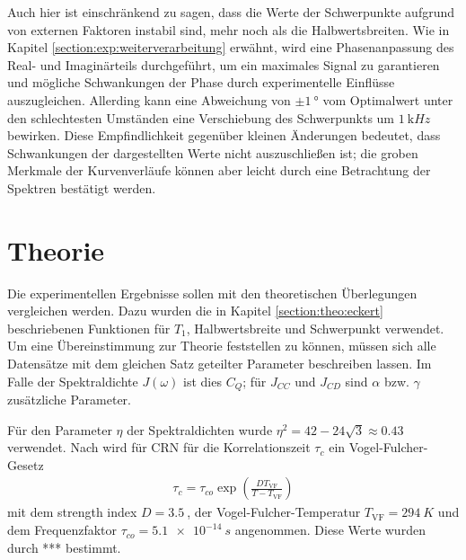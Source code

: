 Auch hier ist einschränkend zu sagen, dass die Werte der Schwerpunkte aufgrund von externen Faktoren instabil sind, mehr noch als die Halbwertsbreiten. Wie in Kapitel \ref{section:exp:weiterverarbeitung} erwähnt, wird eine Phasenanpassung des Real- und Imaginärteils durchgeführt, um ein maximales Signal zu garantieren und mögliche Schwankungen der Phase durch experimentelle Einflüsse auszugleichen. Allerding kann eine Abweichung von $\pm \SI{1}{\degree}$ vom Optimalwert unter den schlechtesten Umständen eine Verschiebung des Schwerpunkts um $\SI{1}{\kilo Hz}$ bewirken. Diese Empfindlichkeit gegenüber kleinen Änderungen bedeutet, dass Schwankungen der dargestellten Werte nicht auszuschließen ist; die groben Merkmale der Kurvenverläufe können aber leicht durch eine Betrachtung der Spektren bestätigt werden.







\section{Theorie} \label{section:res:theorie}



Die experimentellen Ergebnisse sollen mit den theoretischen Überlegungen vergleichen werden. Dazu wurden die in Kapitel \ref{section:theo:eckert} beschriebenen Funktionen für $T_1$, Halbwertsbreite und Schwerpunkt verwendet. Um eine Übereinstimmung zur Theorie feststellen zu können, müssen sich alle Datensätze mit dem gleichen Satz geteilter Parameter beschreiben lassen. Im Falle der Spektraldichte $J(\omega)$ ist dies $C_Q$; für $J_{CC}$ und $J_{CD}$ sind $\alpha$ bzw. $\gamma$ zusätzliche Parameter.

Für den Parameter $\eta$ der Spektraldichten wurde $\eta^2 = 42 - 24 \sqrt{3} \approx \SI{0.43}{}$ \cite{caer} verwendet. Nach \cite{PIMENOV199793} wird für CRN für die Korrelationszeit $\tau_c$ ein Vogel-Fulcher-Gesetz
\begin{align}
	\tau_c = \tau_{co} \exp \left( \frac{D T_\text{VF}}{T-T_\text{VF}} \right)
\end{align}
mit dem strength index $D = \SI{3.5}{}$, der Vogel-Fulcher-Temperatur $T_\text{VF} = \SI{294}{K}$ und dem Frequenzfaktor $\tau_{co} = \SI{5.1e-14}{s}$ angenommen. Diese Werte wurden durch *** bestimmt.

